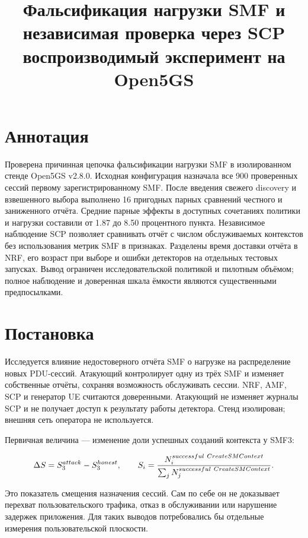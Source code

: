 \documentclass[11pt,a4paper]{article}
\begin{document}
\title{Фальсификация нагрузки SMF и независимая проверка через SCP  воспроизводимый эксперимент на Open5GS}
\author{}\date{}\maketitle

\section*{Аннотация}

Проверена причинная цепочка фальсификации нагрузки SMF в изолированном стенде Open5GS v2.8.0. Исходная конфигурация назначала все 900 проверенных сессий первому зарегистрированному SMF. После введения свежего discovery и взвешенного выбора выполнено 16 пригодных парных сравнений честного и заниженного отчёта. Средние парные эффекты в доступных сочетаниях политики и нагрузки составили от 1.87 до 8.50 процентного пункта. Независимое наблюдение SCP позволяет сравнивать отчёт с числом обслуживаемых контекстов без использования метрик SMF в признаках. Разделены время доставки отчёта в NRF, его возраст при выборе и ошибки детекторов на отдельных тестовых запусках. Вывод ограничен исследовательской политикой и пилотным объёмом; полное наблюдение и доверенная шкала ёмкости являются существенными предпосылками. 

\section*{Постановка}

Исследуется влияние недостоверного отчёта SMF о нагрузке на распределение новых PDU-сессий. Атакующий контролирует одну из трёх SMF и изменяет собственные отчёты, сохраняя возможность обслуживать сессии. NRF, AMF, SCP и генератор UE считаются доверенными. Атакующий не изменяет журналы SCP и не получает доступ к результату работы детектора. Стенд изолирован; внешняя сеть оператора не используется.

Первичная величина — изменение доли успешных созданий контекста у SMF3:

\[
\Delta S=S_3^{attack}-S_3^{honest},\qquad
S_i={N_i^{successful\ CreateSMContext}\over\sum_jN_j^{successful\ CreateSMContext}}.
\]

Это показатель смещения назначения сессий. Сам по себе он не доказывает перехват пользовательского трафика, отказ в обслуживании или нарушение задержек приложения. Для таких выводов потребовались бы отдельные измерения пользовательской плоскости.
\end{document}
